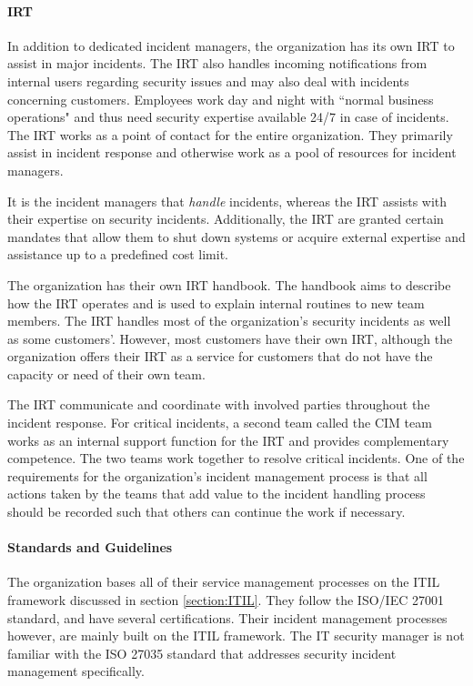 \paragraph{\acl{IRT}}
In addition to dedicated incident managers, the organization has its own \ac{IRT} to assist in major incidents. The \ac{IRT} also handles incoming notifications from internal users regarding security issues and may also deal with incidents concerning customers. Employees work day and night with ``normal business operations" and thus need security expertise available 24/7 in case of incidents. The \ac{IRT} works as a point of contact for the entire organization. They primarily assist in incident response and otherwise work as a pool of resources for incident managers. 

It is the incident managers that \emph{handle} incidents, whereas the \ac{IRT} assists with their expertise on security incidents. Additionally, the \ac{IRT} are granted certain mandates that allow them to shut down systems or acquire external expertise and assistance up to a predefined cost limit.    

The organization has their own \ac{IRT} handbook. The handbook aims to describe how the \ac{IRT} operates and is used to explain internal routines to new team members. The \ac{IRT} handles most of the organization's security incidents as well as some customers'. However, most customers have their own \ac{IRT}, although the organization offers their \ac{IRT} as a service for customers that do not have the capacity or need of their own team.

The \ac{IRT} communicate and coordinate with involved parties throughout the incident response. For critical incidents, a second team called the \ac{CIM} team works as an internal support function for the \ac{IRT} and provides complementary competence. The two teams work together to resolve critical incidents. One of the requirements for the organization's incident management process is that all actions taken by the teams that add value to the incident handling process should be recorded such that others can continue the work if necessary.

\paragraph{Standards and Guidelines}
The organization bases all of their service management processes on the ITIL framework discussed in section \ref{section:ITIL}. They follow the ISO/IEC 27001 standard, and have several certifications. Their incident management processes however, are mainly built on the ITIL framework. The IT security manager is not familiar with the ISO 27035 standard that addresses security incident management specifically. 

